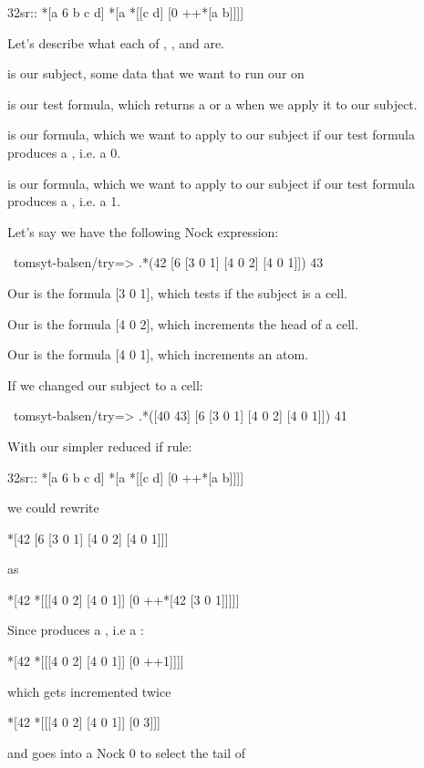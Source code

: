 \begin{code}
32sr::   *[a 6 b c d]     *[a *[[c d] [0 ++*[a b]]]]
\end{code}
Let's describe what each of , ,  and  are.

 is our subject, some data that we want to run our  on

 is our test formula, which returns a  or a  when we apply it to our subject.

 is our  formula, which we want to apply to our subject if our test formula produces a , i.e. a 0.

 is our  formula, which we want to apply to our subject if our test formula produces a , i.e. a 1.

Let's say we have the following Nock expression:

\begin{code}
~tomsyt-balsen/try=> .*(42 [6 [3 0 1] [4 0 2] [4 0 1]])
43
\end{code}
Our  is the formula [3 0 1], which tests if the subject is a cell.

Our  is the formula [4 0 2], which increments the head of a cell.

Our  is the formula [4 0 1], which increments an atom.

If we changed our subject to a cell:

\begin{code}
~tomsyt-balsen/try=> .*([40 43] [6 [3 0 1] [4 0 2] [4 0 1]])
41
\end{code}
With our simpler reduced if rule:

\begin{code}
32sr::   *[a 6 b c d]     *[a *[[c d] [0 ++*[a b]]]]
\end{code}
we could rewrite

\begin{code}
*[42 [6 [3 0 1] [4 0 2] [4 0 1]]]
\end{code}
as

\begin{code}
*[42  *[[[4 0 2] [4 0 1]] [0 ++*[42 [3 0 1]]]]]
\end{code}
Since \kode{*[42 [3 0 1]]} produces a , i.e a :

\begin{code}
*[42  *[[[4 0 2] [4 0 1]] [0 ++1]]]]
\end{code}
which gets incremented twice
\begin{code}
*[42  *[[[4 0 2] [4 0 1]] [0 3]]]
\end{code}
and goes into a Nock 0 to select the tail of \kode{[[4 0 2] [4 0 1]]}

